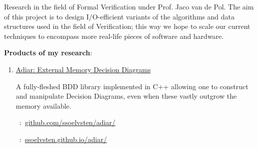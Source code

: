 
Research in the field of Formal Verification under Prof. Jaco van de Pol. The
aim of this project is to design I/O-efficient variants of the algorithms and
data structures used in the field of Verification; this way we hope
to scale our current techniques to encompass more real-life pieces of software
and hardware.

\medskip

\textbf{Products of my research}:

\medskip

\hspace{1em}
\begin{minipage}{29.5em}
  \begin{flushleft}
    \begin{enumerate}
      
    \item[\faCode]
      \href{http://github.com/ssoelvsten/adiar}{Adiar: External Memory Decision Diagrams}

      \smallskip

      A fully-fleshed BDD library implemented in C++ allowing one to construct
      and manipulate Decision Diagrams, even when these vastly outgrow the
      memory available.

      \smallskip

      \faGit\ :\
      \href{https://github.com/ssoelvsten/adiar/}{github.com/ssoelvsten/adiar/}

      \faFileTextO\ :\
      \href{https://ssoelvsten.github.io/adiar/}{ssoelvsten.github.io/adiar/}
      
    \end{enumerate}
  \end{flushleft}
\end{minipage}

\medskip
